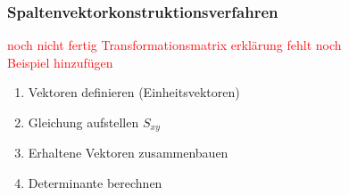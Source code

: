\subsubsection{Spaltenvektorkonstruktionsverfahren}
\textcolor{red}{noch nicht fertig Transformationsmatrix erklärung fehlt noch}\\
\textcolor{red}{Beispiel hinzufügen}\\
\begin{enumerate}
    \item Vektoren definieren (Einheitsvektoren)
    \item Gleichung aufstellen $S_{xy}$
    \item Erhaltene Vektoren zusammenbauen
    \item Determinante berechnen
\end{enumerate}